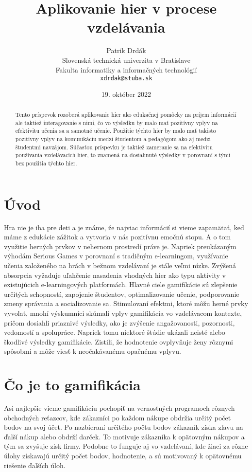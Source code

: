 \documentclass[10pt,twoside,slovak,a4paper]{article}
\title{Aplikovanie hier v procese vzdelávania
} %
\author{Patrik Drdák\\[2pt]
	{\small Slovenská technická univerzita v Bratislave}\\
	{\small Fakulta informatiky a informačných technológií}\\
	{\small \texttt{xdrdak@stuba.sk}}
	}
\date{\small 19. október 2022} %
\begin{document}
\maketitle

\begin{abstract}
Tento príspevok rozoberá aplikovanie hier
ako edukačnej pomôcky na príjem informácií ale taktiež interagovanie s nimi,
čo vo výsledku by malo mať pozitívny vplyv na efektivitu učenia sa a samotné
učenie. Použitie týchto hier by malo mať takisto pozitívny vplyv na komunikáciu medzi študentom a pedagógom ako aj medzi študentmi navzájom. Súčasťou príspevku je taktiež zameranie sa na efektivitu používania vzdelávacích hier, to znamená na dosiahnuté výsledky v porovnaní s tými bez použitia týchto hier.

\end{abstract}



\section{Úvod}

Hra nie je iba pre deti a je známe, že najviac informácií si vieme zapamätať, keď máme z edukácie zážitok a vytvoria v nás pozitívnu emočnú stopu. A o tom využitie herných prvkov v nehernom prostredí práve je. Napriek preukázaným výhodám Serious Games v porovnaní s tradičným e-learningom, využívanie učenia založeného na hrách
v bežnom vzdelávaní je stále veľmi nízke. Zvýšená absorpcia
vyžaduje uľahčenie nasadenia vhodných hier ako typu aktivity
v existujúcich e-learningových platformách. Hlavné ciele gamifikácie sú zlepšenie určitých schopností, zapojenie študentov, optimalizovanie učenie, podporovanie zmeny správania a socializovanie sa. Stimulovaní efektmi, ktoré môžu herné prvky vyvolať, mnohí výskumníci skúmali vplyv gamifikácia vo vzdelávacom kontexte, pričom dosiahli priaznivé výsledky, ako je zvýšenie angažovanosti, pozornosti, vedomostí a spolupráce. Napriek tomu niektoré štúdie ukázali neisté alebo škodlivé výsledky gamifikácie. Zistili, že hodnotenie ovplyvňuje ženy rôznymi spôsobmi a môže viesť k neočakávanému opačnému vplyvu.

\section{Čo je to gamifikácia}
Asi najlepšie vieme gamifikáciu pochopiť na vernostných programoch rôznych obchodných reťazcov, kde zákazníci po každom nákupe obdržia určitý počet bodov na svoj účet. Po nazbieraní určitého počtu bodov zákazník získa zľavu na ďalší nákup alebo obdrží darček. To motivuje zákazníka k opätovným nákupov a tým sa zvyšuje zisk firmy. Podobne to funguje aj vo vzdelávaní, kde žiaci za rôzne úlohy získavajú určitý počet bodov, hodnotenie, a sú motivovaný k opätovnému riešenie ďalších úloh. 
\end{document}
